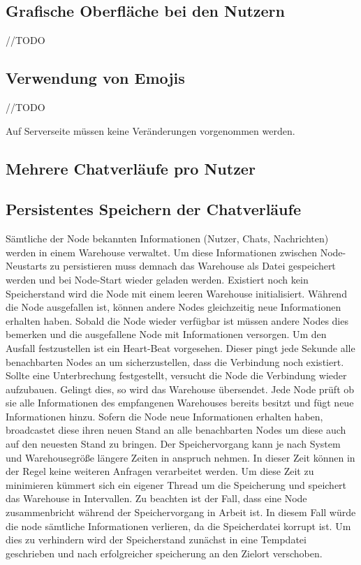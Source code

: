 
\subsection{Grafische Oberfläche bei den Nutzern}
//TODO 

\subsection{Verwendung von Emojis}
//TODO

Auf Serverseite müssen keine Veränderungen vorgenommen werden.

\subsection{Mehrere Chatverläufe pro Nutzer}

\subsection{Persistentes Speichern der Chatverläufe}
Sämtliche der Node bekannten Informationen (Nutzer, Chats, Nachrichten) werden in einem Warehouse verwaltet. Um diese Informationen zwischen Node-Neustarts zu persistieren muss demnach das Warehouse als Datei gespeichert werden und bei Node-Start wieder geladen werden. Existiert noch kein Speicherstand wird die Node mit einem leeren Warehouse initialisiert. Während die Node ausgefallen ist, können andere Nodes gleichzeitig neue Informationen erhalten haben. Sobald die Node wieder verfügbar ist müssen andere Nodes dies bemerken und die ausgefallene Node mit Informationen versorgen. Um den Ausfall festzustellen ist ein Heart-Beat vorgesehen. Dieser pingt jede Sekunde alle benachbarten Nodes an um sicherzustellen, dass die Verbindung noch existiert. Sollte eine Unterbrechung festgestellt, versucht die Node die Verbindung wieder aufzubauen. Gelingt dies, so wird das Warehouse übersendet. Jede Node prüft ob sie alle Informationen des empfangenen Warehouses bereits besitzt und fügt neue Informationen hinzu. Sofern die Node neue Informationen erhalten haben, broadcastet diese ihren neuen Stand an alle benachbarten Nodes um diese auch auf den neuesten Stand zu bringen.
Der Speichervorgang kann je nach System und Warehousegröße längere Zeiten in anspruch nehmen. In dieser Zeit können in der Regel keine weiteren Anfragen verarbeitet werden. Um diese Zeit zu minimieren kümmert sich ein eigener Thread um die Speicherung und speichert das Warehouse in Intervallen.
Zu beachten ist der Fall, dass eine Node zusammenbricht während der Speichervorgang in Arbeit ist. In diesem Fall würde die node sämtliche Informationen verlieren, da die Speicherdatei korrupt ist. Um dies zu verhindern wird der Speicherstand zunächst in eine Tempdatei geschrieben und nach erfolgreicher speicherung an den Zielort verschoben.


